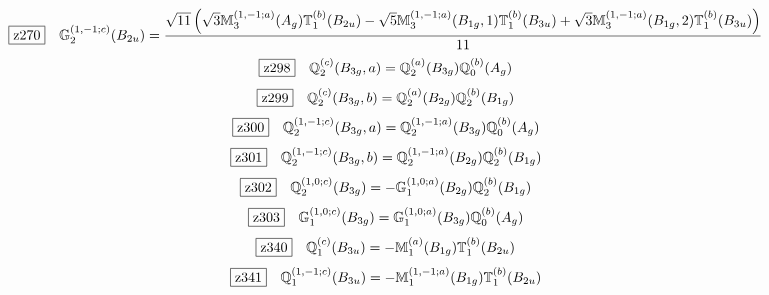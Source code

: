 \documentclass[fleqn,10pt,landscape]{jsarticle}
\begin{document}
\begin{dmath*}
\hspace*{3mm}\fbox{z270}\quad \mathbb{G}_{2}^{(1,-1;c)}(B_{2u})=\frac{\sqrt{11} \left(\sqrt{3} \mathbb{M}_{3}^{(1,-1;a)}(A_{g}) \mathbb{T}_{1}^{(b)}(B_{2u}) - \sqrt{5} \mathbb{M}_{3}^{(1,-1;a)}(B_{1g},1) \mathbb{T}_{1}^{(b)}(B_{3u}) + \sqrt{3} \mathbb{M}_{3}^{(1,-1;a)}(B_{1g},2) \mathbb{T}_{1}^{(b)}(B_{3u})\right)}{11}
\end{dmath*}
\begin{dmath*}
\hspace*{3mm}\fbox{z298}\quad \mathbb{Q}_{2}^{(c)}(B_{3g},a)=\mathbb{Q}_{2}^{(a)}(B_{3g}) \mathbb{Q}_{0}^{(b)}(A_{g})
\end{dmath*}
\begin{dmath*}
\hspace*{3mm}\fbox{z299}\quad \mathbb{Q}_{2}^{(c)}(B_{3g},b)=\mathbb{Q}_{2}^{(a)}(B_{2g}) \mathbb{Q}_{2}^{(b)}(B_{1g})
\end{dmath*}
\begin{dmath*}
\hspace*{3mm}\fbox{z300}\quad \mathbb{Q}_{2}^{(1,-1;c)}(B_{3g},a)=\mathbb{Q}_{2}^{(1,-1;a)}(B_{3g}) \mathbb{Q}_{0}^{(b)}(A_{g})
\end{dmath*}
\begin{dmath*}
\hspace*{3mm}\fbox{z301}\quad \mathbb{Q}_{2}^{(1,-1;c)}(B_{3g},b)=\mathbb{Q}_{2}^{(1,-1;a)}(B_{2g}) \mathbb{Q}_{2}^{(b)}(B_{1g})
\end{dmath*}
\begin{dmath*}
\hspace*{3mm}\fbox{z302}\quad \mathbb{Q}_{2}^{(1,0;c)}(B_{3g})=- \mathbb{G}_{1}^{(1,0;a)}(B_{2g}) \mathbb{Q}_{2}^{(b)}(B_{1g})
\end{dmath*}
\begin{dmath*}
\hspace*{3mm}\fbox{z303}\quad \mathbb{G}_{1}^{(1,0;c)}(B_{3g})=\mathbb{G}_{1}^{(1,0;a)}(B_{3g}) \mathbb{Q}_{0}^{(b)}(A_{g})
\end{dmath*}
\begin{dmath*}
\hspace*{3mm}\fbox{z340}\quad \mathbb{Q}_{1}^{(c)}(B_{3u})=- \mathbb{M}_{1}^{(a)}(B_{1g}) \mathbb{T}_{1}^{(b)}(B_{2u})
\end{dmath*}
\begin{dmath*}
\hspace*{3mm}\fbox{z341}\quad \mathbb{Q}_{1}^{(1,-1;c)}(B_{3u})=- \mathbb{M}_{1}^{(1,-1;a)}(B_{1g}) \mathbb{T}_{1}^{(b)}(B_{2u})
\end{dmath*}
\end{document}
